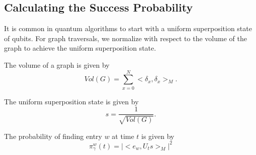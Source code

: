 \subsection{Calculating the Success Probability}
It is common in quantum algorithms to start with a uniform superposition state of qubits.
For graph traversals, we normalize with respect to the volume of the graph to achieve the uniform superposition state. 
\begin{definition}
The volume of a graph is given by
$$
Vol(G) = \sum_{x=0}^N<\delta_x, \delta_x>_M.
$$
\end{definition}
\begin{definition}
The uniform superposition state is given by
$$
s = \frac{1}{\sqrt{Vol(G)}}.
$$
\end{definition}
\begin{definition}
The probability of finding entry $w$ at time $t$ is given by
$$
\pi_{\gamma}^w(t) = |<e_w, U_t s>_M|^2
$$
\end{definition}
